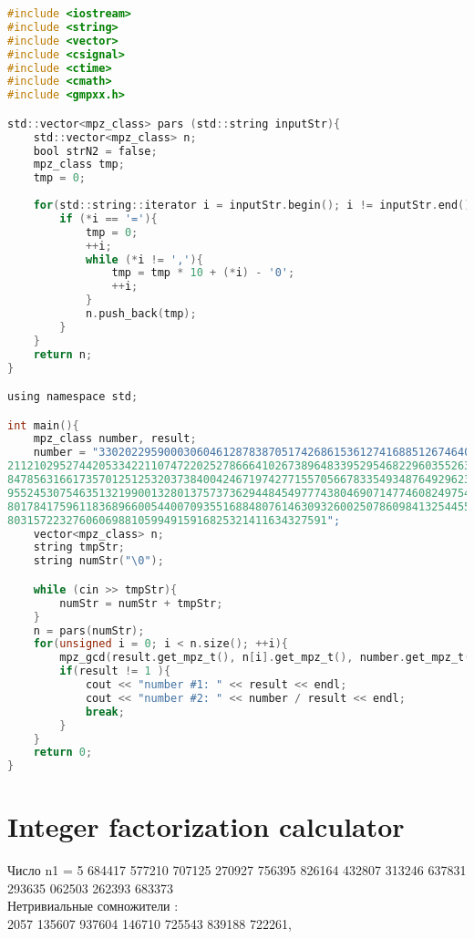 \begin{lstlisting}[language=C]
#include <iostream>
#include <string>
#include <vector>
#include <csignal>
#include <ctime>
#include <cmath>
#include <gmpxx.h>

std::vector<mpz_class> pars (std::string inputStr){
    std::vector<mpz_class> n;
    bool strN2 = false;
    mpz_class tmp;
    tmp = 0;
    
    for(std::string::iterator i = inputStr.begin(); i != inputStr.end(); ++i){
        if (*i == '='){
            tmp = 0;
            ++i;
            while (*i != ','){ 
                tmp = tmp * 10 + (*i) - '0';
                ++i;
            }
            n.push_back(tmp);
        }
    }
    return n;
}

using namespace std;

int main(){
    mpz_class number, result;
    number = "33020229590003060461287838705174268615361274168851267464051633959211178618
2112102952744205334221107472202527866641026738964833952954682296035526349373351638998
8478563166173570125125320373840042467197427715570566783354934876492962376348888456514
9552453075463513219900132801375737362944845497774380469071477460824975475747214155932
8017841759611836896600544007093551688480761463093260025078609841325445558002874051585
8031572232760606988105994915916825321411634327591";
    vector<mpz_class> n;
    string tmpStr;
    string numStr("\0");

    while (cin >> tmpStr){
        numStr = numStr + tmpStr;
    }
    n = pars(numStr);
    for(unsigned i = 0; i < n.size(); ++i){
        mpz_gcd(result.get_mpz_t(), n[i].get_mpz_t(), number.get_mpz_t());
        if(result != 1 ){ 
            cout << "number #1: " << result << endl;
            cout << "number #2: " << number / result << endl;
            break;
        }
    }
    return 0;
}
\end{lstlisting}

\pagebreak

\section{Integer factorization calculator}

Число n1 = 5 684417 577210 707125 270927 756395 826164 432807 313246 637831 293635 062503 262393 683373\\

Нетривиальные сомножители :\\
2057 135607 937604 146710 725543 839188 722261,\\


